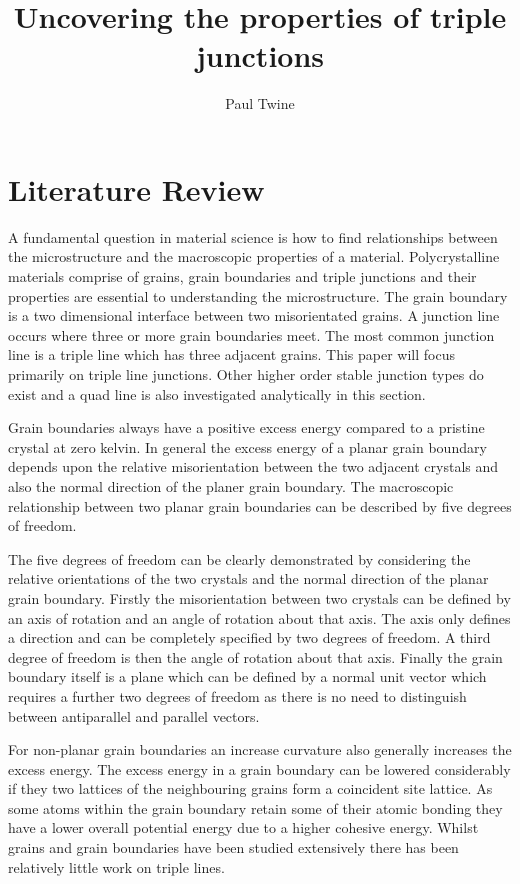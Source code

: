 \documentclass[12pt,a4paper]{book}
\title{Uncovering the properties of triple junctions}
\author{Paul Twine}
\begin{document}
\maketitle

\chapter{Literature Review}

\nocite{*}
A fundamental question in material science is how to find relationships between the microstructure and the macroscopic properties of a material. Polycrystalline materials comprise of grains, grain boundaries and triple junctions and their properties are essential to understanding the microstructure. The grain boundary is a two dimensional interface between two misorientated grains. A junction line occurs where three or more grain boundaries meet. The most common junction line is a triple line which has three adjacent grains. This paper will focus primarily on triple line junctions. Other higher order stable junction types do exist and a quad line is also investigated analytically in this section. 

Grain boundaries always have a positive excess energy compared to a pristine crystal at zero kelvin. In general the excess energy of a planar grain boundary depends upon the relative misorientation between the two adjacent crystals and also the normal direction of the planer grain boundary. The macroscopic relationship between two planar grain boundaries can be described by five degrees of freedom. 

The five degrees of freedom can be clearly demonstrated by considering the relative orientations of the two crystals and the normal direction of the planar grain boundary. Firstly the misorientation between two crystals can be defined by an axis of rotation and an angle of rotation about that axis.  The axis only defines a direction and can be completely specified by two degrees of freedom. A third degree of freedom is then the angle of rotation about that axis. Finally the grain boundary itself is a plane which can be defined by a normal unit vector which requires a further two degrees of freedom as there is no need to distinguish between antiparallel and parallel vectors.


For non-planar grain boundaries an increase curvature also generally increases the excess energy.  The excess energy in a grain boundary can be lowered considerably if they two lattices of the neighbouring grains form a coincident site lattice. As some atoms within the grain boundary retain some of their atomic bonding they have a lower overall potential energy due to a higher cohesive energy. Whilst grains and grain boundaries have been studied extensively there has been relatively little work on triple lines.
\end{document}
